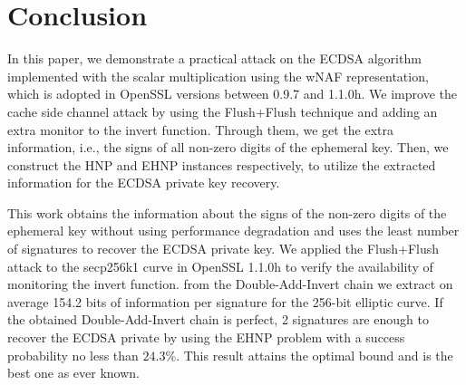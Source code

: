 \section{Conclusion}
\label{sec:conclusion}
In this paper, we demonstrate a practical attack on the ECDSA algorithm implemented  with the scalar multiplication using the wNAF representation, which is adopted in OpenSSL versions between 0.9.7 and 1.1.0h.
We improve the cache side channel attack
 by using the Flush+Flush technique and adding an extra monitor to the invert function.
Through them, we get the extra information, i.e., the signs of all non-zero digits of the ephemeral key.
Then, we construct the HNP and EHNP instances respectively,  to utilize the extracted information for the ECDSA private key recovery.


This work obtains the information about the signs of the non-zero digits of the ephemeral key without using performance degradation and uses the least number of signatures to recover the ECDSA private key.
We applied the Flush+Flush attack to the secp256k1 curve in OpenSSL 1.1.0h to verify the availability of monitoring the invert function.
from the Double-Add-Invert chain we extract on average 154.2 bits of information per signature for the 256-bit elliptic curve.
If the obtained Double-Add-Invert chain is perfect,
2 signatures are enough to recover the ECDSA private by using the EHNP problem with a success probability no less than $24.3\%$.
This result attains the optimal bound and is the best one as ever known.






